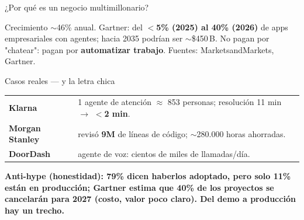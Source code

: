 \documentclass[aspectratio=169, 11pt]{beamer}
\begin{document}
\begin{frame}{¿Por qué es un negocio multimillonario?}
  \vspace{10pt}
  \begin{center}
  \end{center}
  \vspace{12pt}
  \begin{nota}{\footnotesize\color{arcaDark}
    Crecimiento $\sim$46\% anual. Gartner: del \textbf{$<$5\% (2025) al 40\% (2026)} de
    apps empresariales con agentes; hacia 2035 podrían ser $\sim$\$450\,B.
    No pagan por "chatear": pagan por \textbf{automatizar trabajo}.
    \hfill{\scriptsize\color{textMuted}Fuentes: MarketsandMarkets, Gartner.}}
  \end{nota}
\end{frame}

\begin{frame}{Casos reales --- y la letra chica}
  \vspace{4pt}
  {\footnotesize
  \begin{tabular}{@{}p{2.7cm}p{9.3cm}@{}}
    \textbf{Klarna} & 1 agente de atención $\approx$ 853 personas; resolución 11 min $\to$ \textbf{$<$2 min}.\\[2pt]
    \textbf{Morgan Stanley} & revisó \textbf{9M} de líneas de código; $\sim$280.000 horas ahorradas.\\[2pt]
    \textbf{DoorDash} & agente de voz: cientos de miles de llamadas/día.\\
  \end{tabular}}
  \vspace{8pt}
  \begin{idea}{\footnotesize\color{arcaDark}\bfseries
    Anti-hype (honestidad): \textbf{79\%} dicen haberlos adoptado, pero solo \textbf{11\%}
    están en producción; Gartner estima que \textbf{40\%} de los proyectos se cancelarán
    para 2027 (costo, valor poco claro). Del demo a producción hay un trecho.}
  \end{idea}
\end{frame}
\end{document}
